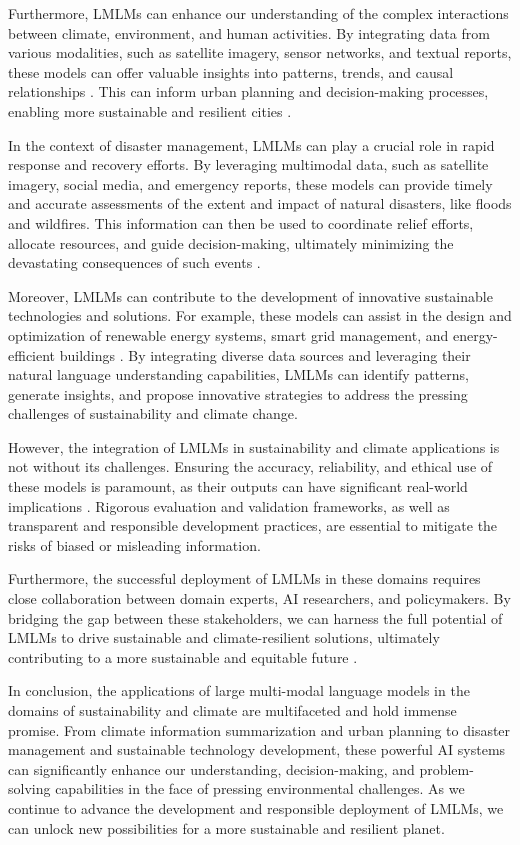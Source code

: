 \documentclass[11pt]{article}
\begin{document}
Furthermore, LMLMs can enhance our understanding of the complex interactions between climate, environment, and human activities. By integrating data from various modalities, such as satellite imagery, sensor networks, and textual reports, these models can offer valuable insights into patterns, trends, and causal relationships \cite{ref216}. This can inform urban planning and decision-making processes, enabling more sustainable and resilient cities \cite{ref217}.

In the context of disaster management, LMLMs can play a crucial role in rapid response and recovery efforts. By leveraging multimodal data, such as satellite imagery, social media, and emergency reports, these models can provide timely and accurate assessments of the extent and impact of natural disasters, like floods and wildfires. This information can then be used to coordinate relief efforts, allocate resources, and guide decision-making, ultimately minimizing the devastating consequences of such events \cite{ref218}.

Moreover, LMLMs can contribute to the development of innovative sustainable technologies and solutions. For example, these models can assist in the design and optimization of renewable energy systems, smart grid management, and energy-efficient buildings \cite{ref101}. By integrating diverse data sources and leveraging their natural language understanding capabilities, LMLMs can identify patterns, generate insights, and propose innovative strategies to address the pressing challenges of sustainability and climate change.

However, the integration of LMLMs in sustainability and climate applications is not without its challenges. Ensuring the accuracy, reliability, and ethical use of these models is paramount, as their outputs can have significant real-world implications \cite{ref219}. Rigorous evaluation and validation frameworks, as well as transparent and responsible development practices, are essential to mitigate the risks of biased or misleading information.

Furthermore, the successful deployment of LMLMs in these domains requires close collaboration between domain experts, AI researchers, and policymakers. By bridging the gap between these stakeholders, we can harness the full potential of LMLMs to drive sustainable and climate-resilient solutions, ultimately contributing to a more sustainable and equitable future \cite{ref220}.

In conclusion, the applications of large multi-modal language models in the domains of sustainability and climate are multifaceted and hold immense promise. From climate information summarization and urban planning to disaster management and sustainable technology development, these powerful AI systems can significantly enhance our understanding, decision-making, and problem-solving capabilities in the face of pressing environmental challenges. As we continue to advance the development and responsible deployment of LMLMs, we can unlock new possibilities for a more sustainable and resilient planet.
\end{document}
